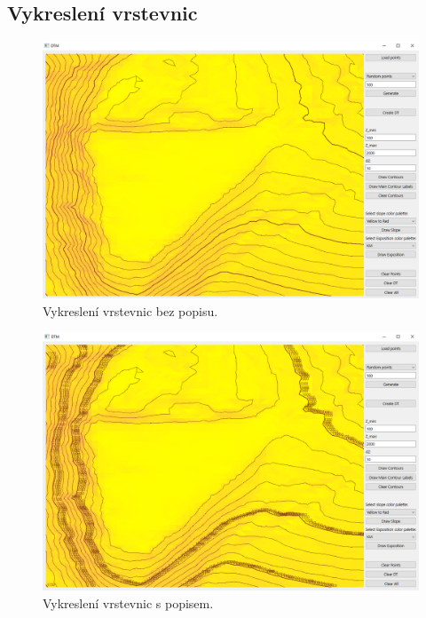 \documentclass[a4paper, 12pt, oneside, titlepage]{article} %
\begin{document}
\subsection{Vykreslení vrstevnic}
\begin{figure}[!htb]
	\centering
	\includegraphics[scale=0.45]{obrazky/vrst_bezpop.png} 
	\caption{Vykreslení vrstevnic bez popisu.
	}
	\label{fig:vrst_bezpop}
\end{figure} 
\FloatBarrier

\begin{figure}[!htb]
	\centering
	\includegraphics[scale=0.45]{obrazky/vrst_pop.png} 
	\caption{Vykreslení vrstevnic s popisem.
	}
	\label{fig:vrst_pop}
\end{figure} 
\FloatBarrier
\end{document}

